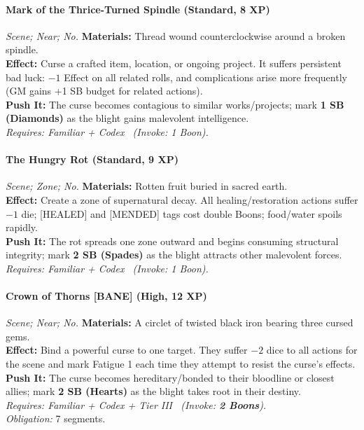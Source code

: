 \paragraph{Mark of the Thrice-Turned Spindle (Standard, 8 XP)} \emph{Scene; Near; No.}
\textbf{Materials:} Thread wound counterclockwise around a broken spindle.\\
\textbf{Effect:} Curse a crafted item, location, or ongoing project. It suffers persistent bad luck: \(-1\) Effect on all related rolls, and complications arise more frequently (GM gains +1 SB budget for related actions).\\
\textbf{Push It:} The curse becomes contagious to similar works/projects; mark \textbf{1 SB (Diamonds)} as the blight gains malevolent intelligence.\\
\emph{Requires: Familiar + Codex \ (\textit{Invoke:} 1 Boon).}

\paragraph{The Hungry Rot (Standard, 9 XP)} \emph{Scene; Zone; No.}
\textbf{Materials:} Rotten fruit buried in sacred earth.\\
\textbf{Effect:} Create a zone of supernatural decay. All healing/restoration actions suffer \(-1\) die; [HEALED] and [MENDED] tags cost double Boons; food/water spoils rapidly.\\
\textbf{Push It:} The rot spreads one zone outward and begins consuming structural integrity; mark \textbf{2 SB (Spades)} as the blight attracts other malevolent forces.\\
\emph{Requires: Familiar + Codex \ (\textit{Invoke:} 1 Boon).}

\paragraph{Crown of Thorns \textnormal{[BANE]} (High, 12 XP)} \emph{Scene; Near; No.}
\textbf{Materials:} A circlet of twisted black iron bearing three cursed gems.\\
\textbf{Effect:} Bind a powerful curse to one target. They suffer \(-2\) dice to all actions for the scene and mark Fatigue 1 each time they attempt to resist the curse's effects.\\
\textbf{Push It:} The curse becomes hereditary/bonded to their bloodline or closest allies; mark \textbf{2 SB (Hearts)} as the blight takes root in their destiny.\\
\emph{Requires: Familiar + Codex + Tier III \ (\textit{Invoke:} \textbf{2 Boons}).}\\
\emph{Obligation:} 7 segments.

